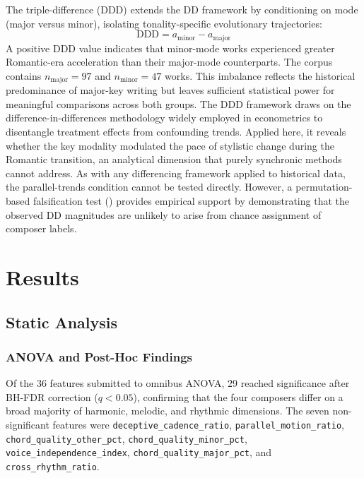 \documentclass[]{interact}
\theoremstyle{plain}
\theoremstyle{definition}
\theoremstyle{remark}
\begin{document}
The triple-difference (DDD) extends the DD framework by conditioning on mode
(major versus minor), isolating tonality-specific evolutionary trajectories:
\begin{equation}\label{eq:ddd}
  \text{DDD} = a_{\text{minor}} - a_{\text{major}}
\end{equation}
A positive DDD value indicates that minor-mode works experienced greater
Romantic-era acceleration than their major-mode counterparts. The corpus
contains $n_{\text{major}} = 97$ and $n_{\text{minor}} = 47$ works. This
imbalance reflects the historical predominance of major-key writing but leaves
sufficient statistical power for meaningful comparisons across both groups. The
DDD framework draws on the difference-in-differences methodology widely
employed in econometrics to disentangle treatment effects from confounding
trends. Applied here, it reveals whether the key modality modulated the pace of
stylistic change during the Romantic transition, an analytical dimension that
purely synchronic methods cannot address. As with any differencing framework
applied to historical data, the parallel-trends condition cannot be tested
directly. However, a permutation-based falsification test
() provides empirical support by demonstrating that the
observed DD magnitudes are unlikely to arise from chance assignment of composer
labels.

\section{Results}\label{sec:results}

\subsection{Static Analysis}

\subsubsection{ANOVA and Post-Hoc Findings}

Of the 36 features submitted to omnibus ANOVA, 29 reached significance after
BH-FDR correction ($q < 0.05$), confirming that the four
composers differ on a broad majority of harmonic, melodic, and rhythmic
dimensions. The seven non-significant features were
\texttt{deceptive\_cadence\_ratio}, \texttt{parallel\_motion\_ratio},
\texttt{chord\_quality\_other\_pct}, \texttt{chord\_quality\_minor\_pct},
\texttt{voice\_independence\_index}, \texttt{chord\_quality\_major\_pct}, and
\texttt{cross\_rhythm\_ratio}.
\end{document}
